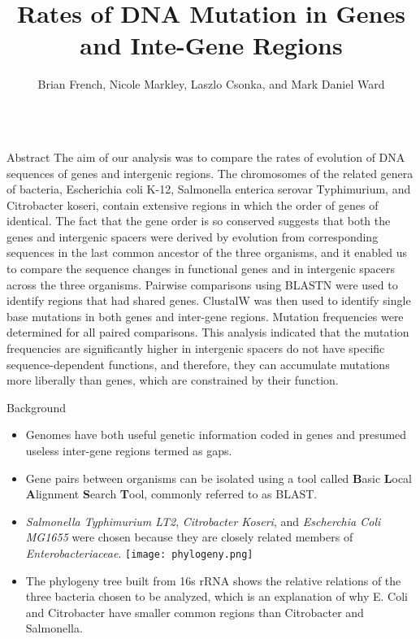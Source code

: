 \documentclass[final]{beamer}
\title[Fancy Posters]{Rates of DNA Mutation in Genes and Inte-Gene Regions}
\author{Brian French, Nicole Markley, Laszlo Csonka, and Mark Daniel Ward}
\institute{Department of Biology, Purdue University, West Lafayette, IN}
\begin{document}
	\begin{frame}{}
	\begin{columns}[t]
		
		
		\begin{column}{.32 \linewidth}
			\begin{block}{\large Abstract}
				The aim of our analysis was to compare the rates of evolution of DNA sequences of genes and intergenic regions. The chromosomes of the related genera of bacteria, Escherichia coli K-12, Salmonella enterica serovar Typhimurium, and Citrobacter koseri, contain extensive regions in which the order of genes of identical. The fact that the gene order is so conserved suggests that both the genes and intergenic spacers were derived by evolution from corresponding sequences in the last common ancestor of the three organisms, and it enabled us to compare the sequence changes in functional genes and in intergenic spacers across the three organisms.
				\newline
				\newline
				Pairwise comparisons using BLASTN were used to identify regions that had shared genes. ClustalW was then used to identify single base mutations in both genes and inter-gene regions. Mutation frequencies were determined for all paired comparisons. This analysis indicated that the mutation frequencies are significantly higher in intergenic spacers do not have specific sequence-dependent functions, and therefore, they can accumulate mutations more liberally than genes, which are constrained by their function.
			\end{block}
			
			\begin{block}{\large Background}
				\begin{itemize}
					\item Genomes have both useful genetic information coded in genes and presumed useless inter-gene regions termed as gaps.
					\item Gene pairs between organisms can be isolated using a tool called \textbf{B}asic \textbf{L}ocal \textbf{A}lignment \textbf{S}earch \textbf{T}ool, commonly referred to as BLAST. 
					
					\item \textit{Salmonella Typhimurium LT2}, \textit{Citrobacter Koseri}, and \textit{Escherchia Coli MG1655} were chosen because they are closely related members of \textit{Enterobacteriaceae}.
					\newline
					\texttt{[image: phylogeny.png]}
					\newline
					\item The phylogeny tree built from 16s rRNA shows the relative relations of the three bacteria chosen to be analyzed, which is an explanation of why E. Coli and Citrobacter have smaller common regions than Citrobacter and Salmonella.
				\end{itemize}
			\end{block}
			

\end{column}
\end{columns}
\end{frame}
\end{document}
